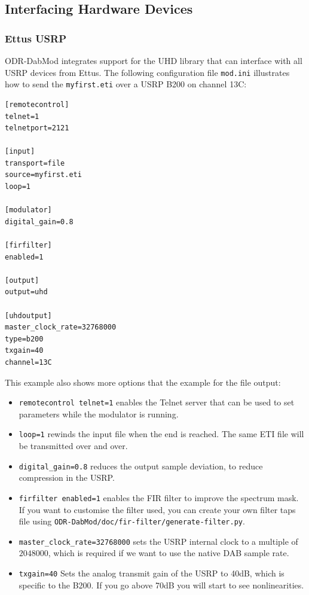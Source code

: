 \subsection{Interfacing Hardware Devices}
\subsubsection{Ettus USRP}
ODR-DabMod integrates support for the UHD library that can interface with all
USRP devices from Ettus. The following configuration file \texttt{mod.ini}
illustrates how to send the \texttt{myfirst.eti} over a USRP B200 on channel
13C:

\begin{lstlisting}
[remotecontrol]
telnet=1
telnetport=2121

[input]
transport=file
source=myfirst.eti
loop=1

[modulator]
digital_gain=0.8

[firfilter]
enabled=1

[output]
output=uhd

[uhdoutput]
master_clock_rate=32768000
type=b200
txgain=40
channel=13C
\end{lstlisting}

This example also shows more options that the example for the file output:

\begin{itemize}
    \item \texttt{remotecontrol telnet=1} enables the Telnet server that can be
        used to set parameters while the modulator is running.
    \item \texttt{loop=1} rewinds the input file when the end is reached. The
        same ETI file will be transmitted over and over.
    \item \texttt{digital\_gain=0.8} reduces the output sample deviation, to
        reduce compression in the USRP.
    \item \texttt{firfilter enabled=1} enables the FIR filter to improve
        the spectrum mask. If you want to customise the filter used, you can
        create your own filter taps file using
        \texttt{ODR-DabMod/doc/fir-filter/generate-filter.py}.
    \item \texttt{master\_clock\_rate=32768000} sets the USRP internal clock to
        a multiple of $2048000$, which is required if we want to use the native
        DAB sample rate.
    \item \texttt{txgain=40} Sets the analog transmit gain of the USRP to 40dB,
        which is specific to the B200. If you go above 70dB you will start to
        see nonlinearities.
\end{itemize}

